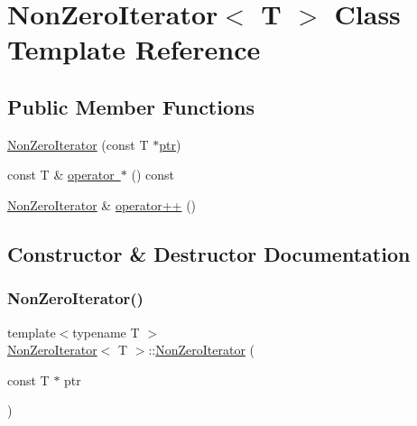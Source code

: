 \hypertarget{class_non_zero_iterator}{}\section{Non\+Zero\+Iterator$<$ T $>$ Class Template Reference}
\label{class_non_zero_iterator}
\subsection*{Public Member Functions}
\begin{DoxyCompactItemize}
\item 
\mbox{\hyperlink{class_non_zero_iterator_abcee50c28d2abd2b54acfea71bca848a}{Non\+Zero\+Iterator}} (const T $\ast$\mbox{\hyperlink{pystrtod_8h_a671b2e1a427060ad8b5362882ed58f5b}{ptr}})
\item 
const T \& \mbox{\hyperlink{class_non_zero_iterator_a86d4ce2584b1b4bad0babcf4a715431c}{operator $\ast$}} () const
\item 
\mbox{\hyperlink{class_non_zero_iterator}{Non\+Zero\+Iterator}} \& \mbox{\hyperlink{class_non_zero_iterator_a236074caae79b4249146d69a66d91511}{operator++}} ()
\end{DoxyCompactItemize}


\subsection{Constructor \& Destructor Documentation}
\mbox{\label{class_non_zero_iterator_abcee50c28d2abd2b54acfea71bca848a}} 
\subsubsection{\texorpdfstring{NonZeroIterator()}{NonZeroIterator()}}
{\footnotesize\ttfamily template$<$typename T $>$ \\
\mbox{\hyperlink{class_non_zero_iterator}{Non\+Zero\+Iterator}}$<$ T $>$\+::\mbox{\hyperlink{class_non_zero_iterator}{Non\+Zero\+Iterator}} (\begin{DoxyParamCaption}\item[{const T $\ast$}]{ptr }\end{DoxyParamCaption})\hspace{0.3cm}{\ttfamily [inline]}}



